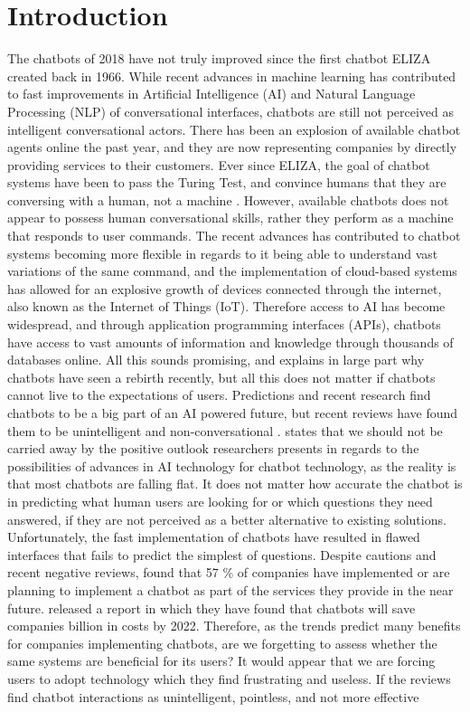 \chapter{Introduction}
\label{chap:introduction}
The chatbots of 2018 have not truly improved since the first chatbot ELIZA created back in 1966. While recent advances in machine learning has contributed to fast improvements in Artificial Intelligence (AI) and Natural Language Processing (NLP) of conversational interfaces, chatbots are still not perceived as intelligent conversational actors. There has been an explosion of available chatbot agents online the past year, and they are now representing companies by directly providing services to their customers. Ever since ELIZA, the goal of chatbot systems have been to pass the Turing Test, and convince humans that they are conversing with a human, not a machine \citep{McTear2016b}. However, available chatbots does not appear to possess human conversational skills, rather they perform as a machine that responds to user commands. The recent advances has contributed to chatbot systems becoming more flexible in regards to it being able to understand vast variations of the same command, and the implementation of cloud-based systems has allowed for an explosive growth of devices connected through the internet, also known as the Internet of Things (IoT). Therefore access to AI has become widespread, and through application programming interfaces (APIs), chatbots have access to vast amounts of information and knowledge through thousands of databases online. All this sounds promising, and explains in large part why chatbots have seen a rebirth recently, but all this does not matter if chatbots cannot live to the expectations of users.  Predictions and recent research find chatbots to be a big part of an AI powered future, but recent reviews have found them to be unintelligent and non-conversational \citep{stokke2017,orf2017,piltch2017,vincent2017,boutin2017}. \cite{piltch2017} states that we should not be carried away by the positive outlook researchers presents in regards to the possibilities of advances in AI technology for chatbot technology, as the reality is that most chatbots are falling flat. It does not matter how accurate the chatbot is in predicting what human users are looking for or which questions they need answered, if they are not perceived as a better alternative to existing solutions. Unfortunately, the fast implementation of chatbots have resulted in flawed interfaces that fails to predict the simplest of questions. Despite cautions and recent negative reviews, \cite{forrester2017} found that 57 \% of companies have implemented or are planning to implement a chatbot as part of the services they provide in the near future. \cite{juniper2017} released a report in which they have found that chatbots will save companies  billion in costs by 2022. Therefore, as the trends predict many benefits for companies implementing chatbots, are we forgetting to assess whether the same systems are beneficial for its users? It would appear that we are forcing users to adopt technology which they find frustrating and useless. If the reviews find chatbot interactions as unintelligent, pointless, and not more effective 